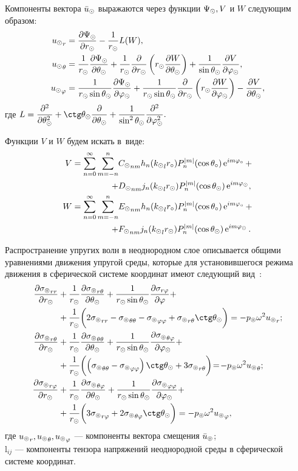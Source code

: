 Компоненты вектора $\bar{u}_\odot$ выражаются через функции $\Psi_\odot, V$ и $W$ следующим образом:
\begin{equation}\label{eq_us}
\begin{split}
{u_\odot}_r &= \frac{\partial \Psi_\odot}{\partial r_\odot} - \frac{1}{r_\odot}L(W),\\
{u_\odot}_\theta &= \frac{1}{r_\odot}\frac{\partial \Psi_\odot}{\partial \theta_\odot} + \frac{1}{r_\odot}\frac{\partial}{\partial r_\odot}\left(r_\odot\frac{\partial W}{\partial \theta_\odot}\right) + \frac{1}{\sin\theta_\odot}\frac{\partial V}{\partial\varphi_\odot},\\
{u_\odot}_\varphi &= \frac{1}{r_\odot \sin\theta_\odot}\frac{\partial \Psi_\odot}{\partial \varphi_\odot} + \frac{1}{r_\odot\sin\theta_\odot}\frac{\partial}{\partial r_\odot}\left(r_\odot\frac{\partial W}{\partial \varphi_\odot}\right) - \frac{\partial V}{\partial \theta_\odot},
\end{split}
\end{equation}
где $L = \df{\de^2}{\de\Q\s^2} + \ctg\Q\s\df{\de}{\de\Q\s} + \df{1}{\sin^2\Q\s}\df{\de^2}{\de\f\s^2}.$

Функции $V$ и $W$ будем искать в~виде:
\begin{align}
V = \sum\limits_{n=0}^\infty \sum\limits_{m=-n}^n &{C_\odot}_{nm} h_n({k_\odot}_lr_\circ)P_n^{\lvert m\rvert}(\cos\theta_\circ)\operatorname{e}^{im\varphi_\circ} + \notag\\
+ &{D_\odot}_{nm} j_n({k_\odot}_lr_\odot)P_n^{\lvert m\rvert}(\cos\theta_\odot)\operatorname{e}^{im\varphi_\odot},\label{eq_v}\\
W = \sum\limits_{n=0}^\infty \sum\limits_{m=-n}^n &{E_\odot}_{nm} h_n({k_\odot}_lr_\circ)P_n^{\lvert m\rvert}(\cos\theta_\circ)\operatorname{e}^{im\varphi_\circ} + \notag\\
+ &{F_\odot}_{nm} j_n({k_\odot}_lr_\odot)P_n^{\lvert m\rvert}(\cos\theta_\odot)\operatorname{e}^{im\varphi_\odot}.\label{eq_w}
\end{align}

Распространение упругих волн в неоднородном слое описывается общими уравнениями движения упругой среды, которые для установившегося режима движения в сферической системе координат имеют следующий вид~\cite{Nowacki}:
\begin{equation}\label{eq_moving}
\begin{split}
\fr{\de{\si\l}_{rr}}{\de r\s} &+ \fr1{r\s} \fr{\de{\si\l}_{r\Q}}{\de\Q\s} + \fr{1}{r\s\sin\Q\s}\fr{\de\si_{r\f}}{\de\f} +\\
&+ \fr1{r\s}\biggl(2{\si\l}_{rr}-{\si\l}_{\Q\Q}-{\si\l}_{\f\f}+{\si\l}_{r\Q}\ctg\Q\s\biggr)=-p\l\om^2{u\l}_r;\\
\fr{\de{\si\l}_{r\Q}}{\de r\s} &+ \fr1{r\s} \fr{\de{\si\l}_{\Q\Q}}{\de\Q\s} + \fr{1}{r\s\sin\Q\s}\fr{\de{\si\l}_{\Q\f}}{\de\f\s} +\\
&+ \fr1{r\s}\biggl(\left({\si\l}_{\Q\Q}-{\si\l}_{\f\f}\right)\ctg\Q\s+3{\si\l}_{r\Q}\biggr)\!=\!-p\l\om^2{u\l}_\Q;\\
\fr{\de{\si\l}_{r\f}}{\de r\s} &+ \fr1{r\s} \fr{\de{\si\l}_{\Q\f}}{\de\Q\s} + \fr{1}{r\s\sin\Q\s}\fr{\de{\si\l}_{\f\f}}{\de\f\s} +\\
&+ \fr1{r\s}\biggl(3{\si\l}_{r\f}+2{\si\l}_{\Q\f}\ctg\Q\s\biggr)=-p\l\om^2{u\l}_\f,
\end{split}
\end{equation}
где ${u_\circledcirc}_r, {u_\circledcirc}_\theta, {u_\circledcirc}_\varphi$ --- компоненты вектора смещения $\bar{u}_\circledcirc$;\\
${\si\l}_{ij}$ --- компоненты тензора напряжений неоднородной среды в сферической системе координат.

